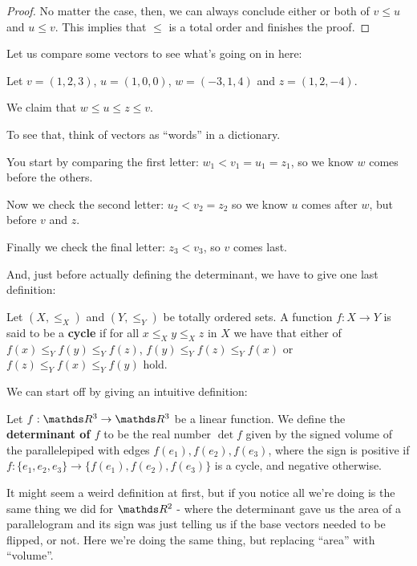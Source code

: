 \begin{proof}
	No matter the case, then, we can always conclude either or both of $v\leq u$ and $u\leq v$. This implies that $\leq$ is a total order and finishes the proof.
\end{proof}

\begin{ex}
	Let us compare some vectors to see what's going on in here:
	
	Let $v=(1,2,3)$, $u=(1,0,0)$, $w=(-3,1,4)$ and $z=(1,2,-4)$.
	
	We claim that $w\leq u\leq z\leq v$.
	
	To see that, think of vectors as ``words'' in a dictionary.
	
	You start by comparing the first letter: $w_1<v_1=u_1=z_1$, so we know $w$ comes before the others.
	
	Now we check the second letter: $u_2<v_2=z_2$ so we know $u$ comes after $w$, but before $v$ and $z$.
	
	Finally we check the final letter: $z_3<v_3$, so $v$ comes last.
\end{ex}

And, just before actually defining the determinant, we have to give one last definition:

\begin{df}
	Let $(X,\leq_X)$ and $(Y,\leq_Y)$ be totally ordered sets. A function $f:X\to Y$ is said to be a \textbf{cycle} if for all $x\leq_X y\leq_X z$ in $X$ we have that either of $f(x)\leq_Y f(y)\leq_Y f(z)$, $f(y)\leq_Y f(z)\leq_Y f(x)$ or $f(z)\leq_Y f(x)\leq_Y f(y)$ hold.
\end{df}

We can start off by giving an intuitive definition:
\begin{df}
	Let $f:\R^3\to\R^3$ be a linear function. We define the \textbf{determinant of $f$} to be the real number $\det f$ given by the signed volume of the parallelepiped with edges $f(e_1),f(e_2),f(e_3)$, where the sign is positive if $f:\{e_1,e_2,e_3\}\to\{f(e_1),f(e_2),f(e_3)\}$ is a cycle, and negative otherwise.
\end{df}

It might seem a weird definition at first, but if you notice all we're doing is the same thing we did for $\R^2$ - where the determinant gave us the area of a parallelogram and its sign was just telling us if the base vectors needed to be flipped, or not. Here we're doing the same thing, but replacing ``area'' with ``volume''.